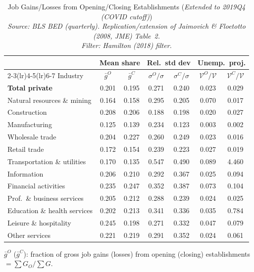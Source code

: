 \begin{table}[htbp]
\centering
\small
\caption{Job Gains/Losses from Opening/Closing Establishments (\emph{Extended to 2019Q4 (COVID cutoff)}) \\
  \emph{Source: BLS BED (quarterly). Replication/extension of Jaimovich \& Floetotto (2008, JME) Table~2.} \\  \emph{Filter: Hamilton (2018) filter.}}
\label{tab:jf_t2_ext_2019_ham}
\begin{tabular}{lcccccc}
\toprule
 & \multicolumn{2}{c}{Mean share} & \multicolumn{2}{c}{Rel.\ std dev} & \multicolumn{2}{c}{Unemp.\ proj.} \\
\cmidrule(lr){2-3}\cmidrule(lr){4-5}\cmidrule(lr){6-7}
Industry & $\bar{g}^O$ & $\bar{g}^C$ & $\sigma^O/\sigma$ & $\sigma^C/\sigma$ & $\mathcal{V}^O/\mathcal{V}$ & $\mathcal{V}^C/\mathcal{V}$ \\
\midrule
\midrule
\textbf{Total private} & 0.201 & 0.195 & 0.271 & 0.240 & 0.023 & 0.029 \\
Natural resources \& mining & 0.164 & 0.158 & 0.295 & 0.205 & 0.070 & 0.017 \\
Construction & 0.208 & 0.206 & 0.188 & 0.198 & 0.020 & 0.027 \\
Manufacturing & 0.125 & 0.139 & 0.234 & 0.123 & 0.003 & 0.002 \\
Wholesale trade & 0.204 & 0.227 & 0.260 & 0.249 & 0.023 & 0.016 \\
Retail trade & 0.172 & 0.154 & 0.239 & 0.223 & 0.027 & 0.019 \\
Transportation \& utilities & 0.170 & 0.135 & 0.547 & 0.490 & 0.089 & 4.460 \\
Information & 0.206 & 0.210 & 0.292 & 0.367 & 0.025 & 0.094 \\
Financial activities & 0.235 & 0.247 & 0.352 & 0.387 & 0.073 & 0.104 \\
Prof.~\& business services & 0.205 & 0.212 & 0.288 & 0.239 & 0.024 & 0.025 \\
Education \& health services & 0.202 & 0.213 & 0.341 & 0.336 & 0.035 & 0.784 \\
Leisure \& hospitality & 0.245 & 0.198 & 0.271 & 0.332 & 0.047 & 0.079 \\
Other services & 0.221 & 0.219 & 0.291 & 0.352 & 0.024 & 0.061 \\
\bottomrule
\end{tabular}
\begin{tablenotes}[flushleft]\footnotesize
\item $\bar{g}^O$ ($\bar{g}^C$): fraction of gross job gains (losses) from opening (closing) establishments $= \sum G_O / \sum G$.

\end{tablenotes}
\end{table}
